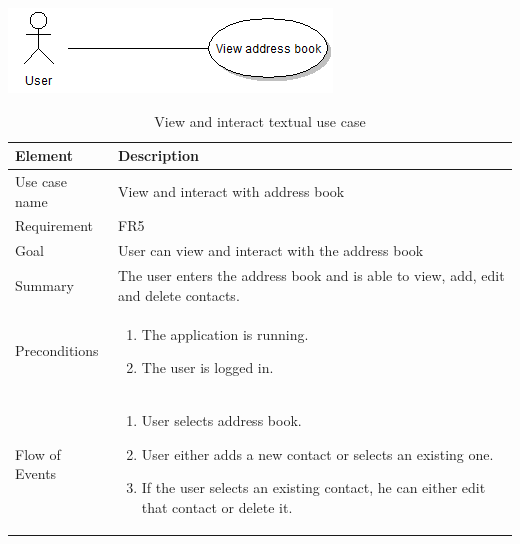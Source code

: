 \begin{table}
\begin{center}
\begin{center}
\includegraphics[width=\textwidth]{view_address_book}
\end{center}
\begin{tabular}{p{3cm}|p{12cm}} \hline
\textbf{Element} & \textbf{Description} \\ \hline \hline
Use case name & View and interact with address book \\
Requirement & FR5 \\
Goal & User can view and interact with the address book \\
Summary &The user enters the address book and is able to view, add, edit and delete contacts. \\
Preconditions &
\begin{enumerate}
\item{}The application is running.
\item{}The user is logged in.
\end{enumerate} \\ \hline
Flow of Events &
\begin{enumerate}
\item{}User selects address book.
\item{}User either adds a new contact or selects an existing one.
\item{}If the user selects an existing contact, he can either edit that contact or delete it.
\end{enumerate} \\ \hline
\end{tabular}
\end{center}
\caption{View and interact textual use case} \label{tab:viewandinteract}
\end{table}

